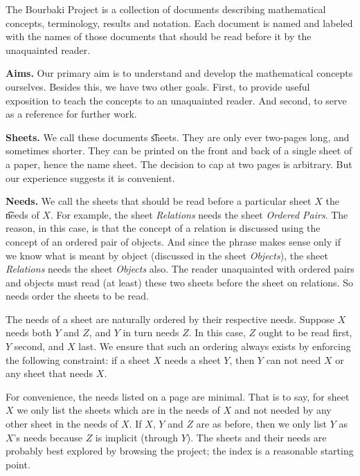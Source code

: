 
The Bourbaki Project is a collection
of documents describing mathematical
concepts, terminology, results and
notation. Each document is named and
labeled with the names of those documents
that should be read before it by the
unaquainted reader.

\textbf{Aims.}
Our primary aim is to understand and
develop the mathematical concepts ourselves.
Besides this, we have two other goals.
First, to provide useful exposition to teach
the concepts to an unaquainted reader.
And second, to serve as a reference for
further work.

\textbf{Sheets.}
We call these documents \t{sheets}.
They are only ever two-pages long, and
sometimes shorter.
They can be printed on the front
and back of a single
sheet of a paper, hence the name sheet.
The decision to cap at two pages is
arbitrary.
But our
experience suggests it is convenient.


\textbf{Needs.}
We call the sheets that should
be read before a particular sheet
$X$ the \t{needs} of $X$.
For example, the sheet \textit{Relations}
needs the sheet \textit{Ordered Pairs}.
The reason, in this case, is that the
concept of a relation is discussed using
the concept of an ordered pair of objects.
And since the phrase
 makes sense
only if we know what is meant by object
(discussed in the sheet \textit{Objects}),
the sheet \textit{Relations} needs the sheet
\textit{Objects} also.
The reader unaquainted with
ordered pairs and
objects must read (at least) these two
sheets before the sheet on relations.
So needs order the sheets to be read.

The needs of a sheet are naturally
ordered by their respective needs.
Suppose $X$ needs both $Y$ and $Z$,
and
 $Y$ in turn needs $Z$.
In this case,
$Z$ ought to
be read first, $Y$ second, and $X$ last.
We ensure that such an ordering
always exists by enforcing
the following constraint:
if a
sheet $X$ needs a sheet $Y$,
then $Y$ can not need $X$ or any sheet
that needs $X$.

For convenience, the needs listed on
a page are minimal. That is to say,
for sheet $X$ we only list the sheets
which are in the needs of $X$
and not needed by any other sheet
in the needs of $X$.
If $X$, $Y$ and $Z$ are as before,
then we only list $Y$ as $X$'s needs
because $Z$ is implicit (through $Y$).
The sheets and their needs are probably
best explored by browsing the project;
the index is
a reasonable starting point.

